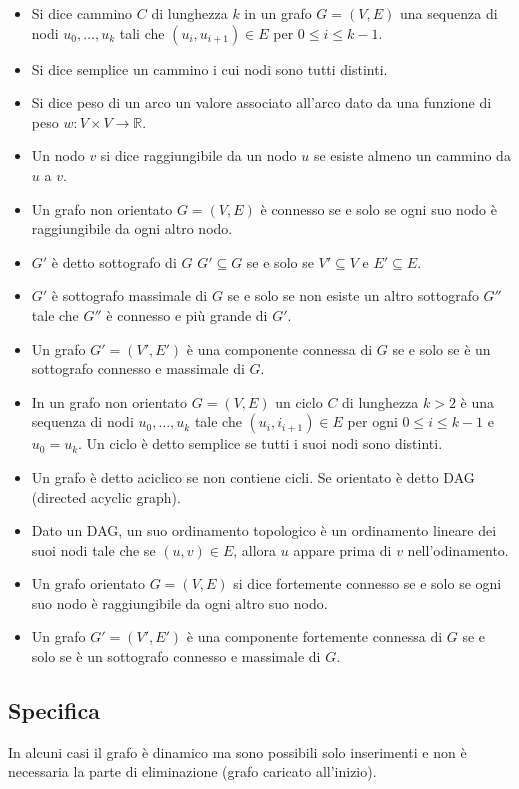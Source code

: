 \begin{itemize}
\item Si dice cammino $C$ di lunghezza $k$ in un grafo $G=(V,E)$ una sequenza di nodi $u_0, \dots, u_k$ tali che $(u_i, u_{i+1})\in E$ per $0\le i\le k-1$.
\item Si dice semplice un cammino i cui nodi sono tutti distinti.
\item Si dice peso di un arco un valore associato all'arco dato da una funzione di peso $w: V\times V\rightarrow\mathbb{R}$.
\item Un nodo $v$ si dice raggiungibile da un nodo $u$ se esiste almeno un cammino da $u$ a $v$. 
\item Un grafo non orientato $G=(V, E)$ \`e connesso se e solo se ogni suo nodo \`e raggiungibile da ogni altro nodo. 
\item $G'$ \`e detto sottografo di $G$ $G'\subseteq G$ se e solo se $V'\subseteq V$ e $E'\subseteq E$.
\item $G'$ \`e sottografo massimale di $G$ se e solo se non esiste un altro sottografo $G''$ tale che $G''$ \`e connesso e pi\`u grande di $G'$.
\item Un grafo $G'=(V', E')$ \`e una componente connessa di $G$ se e solo se \`e un sottografo connesso e massimale di $G$.
\item In un grafo non orientato $G=(V, E)$ un ciclo $C$ di lunghezza $k>2$ \`e una sequenza di nodi $u_0, \dots, u_k$ tale che $(u_i, i_{i+1})\in E$ per 
ogni $0\le i\le k-1$ e $u_0=u_k$. Un ciclo \`e detto semplice se tutti i suoi nodi sono distinti. 
\item Un grafo \`e detto aciclico se non contiene cicli. Se orientato \`e detto DAG (directed acyclic graph). 
\item Dato un DAG, un suo ordinamento topologico \`e un ordinamento lineare dei suoi nodi tale che se $(u, v)\in E$, allora $u$ appare prima di $v$ 
nell'odinamento.
\item Un grafo orientato $G=(V, E)$ si dice fortemente connesso se e solo se ogni suo nodo \`e raggiungibile da ogni altro suo nodo.
\item Un grafo $G'=(V', E')$ \`e una componente fortemente connessa di $G$ se e solo se \`e un sottografo connesso e massimale di $G$. 
\end{itemize}
\subsection{Specifica}

In alcuni casi il grafo \`e dinamico ma sono possibili solo inserimenti e non \`e necessaria la parte di eliminazione (grafo caricato all'inizio).
